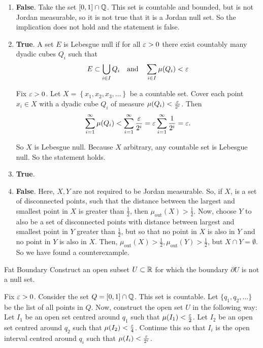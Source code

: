 \documentclass[12pt]{article}
\begin{document}
\begin{enumerate}
    \item \textbf{False}. Take the set $[0, 1] \cap \mathbb{Q}$. This set is countable and bounded, but is not Jordan measurable, so it is not true that it is a Jordan null set. So the implication does not hold and the statement is false.
    \item \textbf{True}. A set $E$ is Lebesgue null if for all $\varepsilon > 0$ there exist countably many dyadic cubes $Q_i$ such that
    $$
        E \subset \bigcup\limits_{i \in I} Q_i \quad \text{and} \quad \sum_{i \in I} \mu(Q_i) < \varepsilon
    $$

    Fix $\varepsilon > 0$. Let $X = \left\{x_1, x_2, x_3, \dots\right\}$ be a countable set. Cover each point $x_i \in X$ with a dyadic cube $Q_i$ of measure $\mu(Q_i) < \frac{\varepsilon}{2^i}$. Then
    $$
        \sum_{i = 1}^{\infty} \mu(Q_i) < \sum_{i = 1}^{\infty} \frac{\varepsilon}{2^i} = \varepsilon \sum_{i = 1}^{\infty} \frac{1}{2^i} = \varepsilon.
    $$

    So $X$ is Lebesgue null. Because $X$ arbitrary, any countable set is Lebesgue null. So the statement holds.
    \item \textbf{True}.
    \item \textbf{False}. Here, $X, Y$ are not required to be Jordan measurable. So, if $X$, is a set of disconnected points, such that the distance between the largest and smallest point in $X$ is greater than $\frac{1}{2}$, then $\mu_{\text{out}}(X) > \frac{1}{2}$. Now, choose $Y$ to also be a set of disconnected points with distance between largest and smallest point in $Y$ greater than $\frac{1}{2}$, but so that no point in $X$ is also in $Y$ and no point in $Y$ is also in $X$. Then, $\mu_{\text{out}}(X) > \frac{1}{2}, \mu_{\text{out}}(Y) > \frac{1}{2}$, but $X \cap Y = \emptyset$. So we have found a counterexample.
\end{enumerate}

\newpage

\begin{problem}{Fat Boundary}{}
    Construct an open subset $U \subset \mathbb{R}$ for which the boundary $\partial U$ is not a null set.
\end{problem}

Fix $\varepsilon > 0$. Consider the set $Q = [0, 1] \cap \mathbb{Q}$. This set is countable. Let $\{q_1, q_2, \dots\}$ be the list of all points in $Q$. Now, construct the open set $U$ in the following way: Let $I_1$ be an open set centred around $q_1$ such that $\mu(I_1) < \frac{\varepsilon}{2}$. Let $I_2$ be an open set centred around $q_2$ such that $\mu(I_2) < \frac{\varepsilon}{4}$. Continue this so that $I_i$ is the open interval centred around $q_i$ such that $\mu(I_i) < \frac{\varepsilon}{2^i}$.
\end{document}
